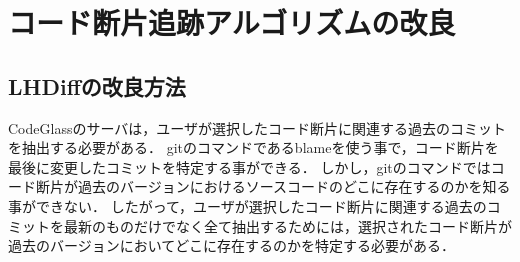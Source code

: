 

\section{コード断片追跡アルゴリズムの改良}

\label{section:Piece_level_Diff_Backtrack_Algorithm}

\subsection{LHDiffの改良方法}
CodeGlassのサーバは，ユーザが選択したコード断片に関連する過去のコミットを抽出する必要がある．
gitのコマンドであるblameを使う事で，コード断片を最後に変更したコミットを特定する事ができる．
しかし，gitのコマンドではコード断片が過去のバージョンにおけるソースコードのどこに存在するのかを知る事ができない．
したがって，ユーザが選択したコード断片に関連する過去のコミットを最新のものだけでなく全て抽出するためには，選択されたコード断片が過去のバージョンにおいてどこに存在するのかを特定する必要がある．




